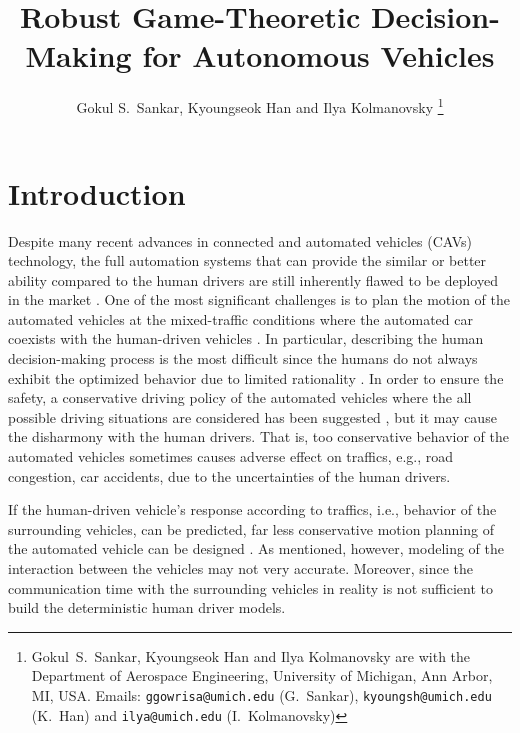 \documentclass[10pt,journal]{IEEEtran}
\begin{document}
	
	\title{Robust Game-Theoretic Decision-Making for Autonomous Vehicles}
	
	\author{
		Gokul S.~Sankar,  Kyoungseok Han and Ilya Kolmanovsky%
		\thanks{Gokul~S.~Sankar,  Kyoungseok Han and Ilya Kolmanovsky are with the Department of Aerospace Engineering, University of Michigan, Ann Arbor, MI, USA. Emails: {\tt\small ggowrisa@umich.edu} (G.~Sankar), 
			{\tt\small kyoungsh@umich.edu} (K.~Han) and  {\tt\small ilya@umich.edu} (I.~Kolmanovsky) }%
	}
	
	
	
	\maketitle
	\thispagestyle{empty}
	\pagestyle{empty}
	
	
	\begin{abstract}
		
	\end{abstract}
	
	\section{Introduction}
	Despite many recent advances in connected and automated vehicles (CAVs) technology, the full automation systems that can provide the similar or better ability compared to the human drivers are still inherently flawed to be deployed in the market \cite{Okuda2014}. One of the most significant challenges is to plan the motion of the automated vehicles at the mixed-traffic conditions where the automated car coexists with the human-driven vehicles \cite{Lazar2018}. In particular, describing the human decision-making process is the most difficult since the humans do not always exhibit the optimized behavior due to limited rationality \cite{Griffiths2015}. In order to ensure the safety, a conservative driving policy of the automated vehicles where the all possible driving situations are considered has been suggested \cite{Claussmann2015, Brechtel2014}, but it may cause the disharmony with the human drivers. That is, too conservative behavior of the automated vehicles sometimes causes adverse effect on traffics, e.g., road congestion, car accidents, due to the uncertainties of the human drivers.
	
	If the human-driven vehicle's response according to traffics, i.e., behavior of the surrounding vehicles, can be predicted, far less conservative motion planning of the automated vehicle can be designed \cite{Sadigh2016}. As mentioned, however, modeling of the interaction between the vehicles may not very accurate. Moreover, since the communication time with the surrounding vehicles in reality is not sufficient to build the deterministic human driver models.
	
\end{document}
